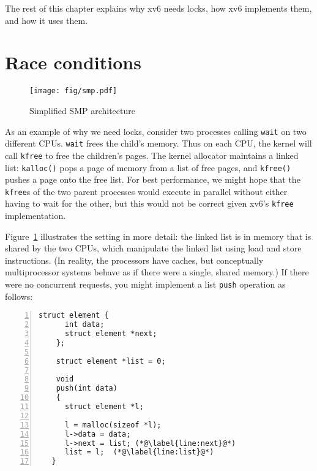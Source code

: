 The rest of this chapter explains why xv6 needs locks, how xv6
implements them, and how it uses them.


% 

\section{Race conditions}

\begin{figure}[t]
\center
\texttt{[image: fig/smp.pdf]}
\caption{Simplified SMP architecture}
\label{fig:smp}
\end{figure}

As an example of why we need locks, consider two processes calling
{\tt wait} on two different
CPUs.  {\tt wait} frees the child's memory.
Thus
on each CPU, the kernel will call {\tt kfree}
to free the children's pages.  The kernel allocator maintains a linked
list: \lstinline{kalloc()}  pops a
page of memory from a list of free pages, and \lstinline{kfree()}
 pushes a page onto the free list.
For best performance, we might hope that the {\tt kfree}s of the two parent processes
would execute in parallel without either having to wait for the other,
but this would not be correct given xv6's {\tt kfree} implementation.

Figure~\ref{fig:smp} illustrates the setting in more detail: the
linked list is in memory that is shared by the two CPUs, which
manipulate the linked list using load and store instructions.  (In
reality, the processors have caches, but conceptually 
multiprocessor systems behave as if there were a single, shared memory.)
If there were no concurrent
requests, you might implement a list \lstinline{push} operation as
follows:
\begin{lstlisting}[numbers=left,firstnumber=1]
    struct element {
      int data;
      struct element *next;
    };
    
    struct element *list = 0;
    
    void
    push(int data)
    {
      struct element *l;
   
      l = malloc(sizeof *l);
      l->data = data;
      l->next = list; (*@\label{line:next}@*)
      list = l;  (*@\label{line:list}@*)
   }
\end{lstlisting}

